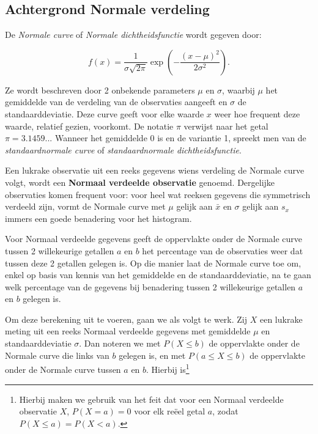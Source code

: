\documentclass[
  12pt,dutch,coursenotes]{book}
\begin{document}
\hypertarget{subsec:normalcalc}{%
\subsection{Achtergrond Normale verdeling}\label{subsec:normalcalc}}

De \emph{Normale curve} of \emph{Normale dichtheidsfunctie} wordt gegeven door:

\begin{equation*}
f(x) = \frac{1}{\sigma \sqrt{2 \pi} } \exp \left ( - \frac{ (x - \mu)^2 }{ 2
\sigma^2} \right ).
\end{equation*}

Ze wordt beschreven door 2 onbekende parameters \(\mu\) en \(\sigma\), waarbij \(\mu\) het gemiddelde van de verdeling van de observaties aangeeft en \(\sigma\)
de standaarddeviatie. Deze curve geeft voor elke waarde \(x\) weer hoe
frequent deze waarde, relatief gezien, voorkomt. De notatie \(\pi\) verwijst
naar het getal \(\pi=3.1459...\) Wanneer het gemiddelde 0 is en de variantie
1, spreekt men van de \emph{standaardnormale curve} of \emph{standaardnormale dichtheidsfunctie}.

Een lukrake observatie uit een reeks gegevens wiens verdeling de Normale
curve volgt, wordt een \textbf{Normaal verdeelde observatie} genoemd.
Dergelijke observaties komen frequent voor: voor heel wat reeksen gegevens
die symmetrisch verdeeld zijn, vormt de Normale curve met \(\mu\) gelijk aan \(\bar x\) en \(\sigma\) gelijk aan \(s_x\) immers een goede benadering voor het
histogram.

Voor Normaal verdeelde gegevens geeft de oppervlakte onder de Normale curve
tussen 2 willekeurige getallen \(a\) en \(b\) het percentage van de
observaties weer dat tussen deze 2 getallen gelegen is. Op die manier laat de
Normale curve toe om, enkel op basis van kennis van het gemiddelde en de
standaarddeviatie, na te gaan welk percentage van de gegevens bij benadering
tussen 2 willekeurige getallen \(a\) en \(b\) gelegen is.

Om deze berekening uit te voeren, gaan we als volgt te werk. Zij \(X\) een
lukrake meting uit een reeks Normaal verdeelde gegevens met gemiddelde \(\mu\)
en standaarddeviatie \(\sigma\). Dan noteren we met \(P(X\leq b)\) de
oppervlakte onder de Normale curve die links van \(b\) gelegen is, en met \(P(a\leq X\leq b)\) de oppervlakte onder de Normale curve tussen \(a\) en \(b\).
Hierbij is\footnote{Hierbij maken we gebruik van het feit dat voor een Normaal verdeelde observatie \(X\), \(P(X=a)=0\) voor elk reëel getal \(a\), zodat \(P(X\leq a)=P(X<a)\).}
\end{document}
